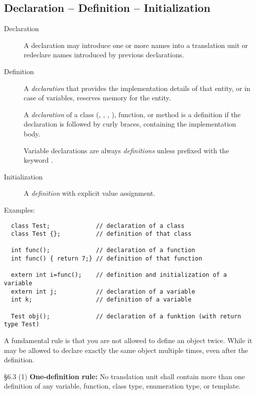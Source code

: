 \subsection{Declaration -- Definition -- Initialization}
\begin{description}
\item[Declaration] A declaration may introduce one or more names into a translation unit or redeclare names
  introduced by previous declarations.

\item[Definition] A \textit{declaration} that provides the implementation details of that entity, or in case of variables, reserves memory for
  the entity.

  A \textit{declaration} of a class (, , , ), function, or method is a definition if the declaration is
  followed by curly braces, containing the implementation body.

  Variable declarations are always \textit{definitions} unless prefixed with the keyword .

\item[Initialization] A \textit{definition} with explicit value assignment.
\end{description}

Examples:
\begin{verbatim}
  class Test;             // declaration of a class
  class Test {};          // definition of that class

  int func();             // declaration of a function
  int func() { return 7;} // definition of that function

  extern int i=func();    // definition and initialization of a variable
  extern int j;           // declaration of a variable
  int k;                  // definition of a variable

  Test obj();             // declaration of a funktion (with return type Test)
\end{verbatim}

A fundamental rule is that you are not allowed to define an object twice. While it may be allowed to declare exactly the same object multiple times, even after the definition.

\begin{standard}{\S 6.3 (1)}
  \textbf{One-definition rule:} No translation unit shall contain more than one definition of any variable, function, class type, enumeration
  type, or template.
\end{standard}

